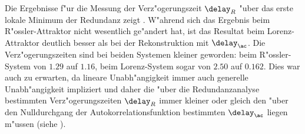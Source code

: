 Die Ergebnisse f"ur die Messung der Verz"ogerungszeit $\delay_R$ "uber das erste lokale
Minimum der Redundanz zeigt . W"ahrend sich das Ergebnis beim
R"ossler-Attraktor nicht wesentlich ge"andert hat, ist das Resultat beim Lorenz-Attraktor
deutlich besser als bei der Rekonstruktion mit $\delay_\ac$. Die Verz"ogerungszeiten sind
bei beiden Systemen kleiner geworden: beim R"ossler-System von $1.29$ auf $1.16$, beim
Lorenz-System sogar von $2.50$ auf $0.162$.  Dies war auch zu erwarten, da lineare
Unabh"angigkeit immer auch generelle Unabh"angigkeit impliziert und daher die "uber die
Redundanzanalyse bestimmten Verz"ogerungszeiten $\delay_R$ immer kleiner oder gleich den
"uber den Nulldurchgang der Autokorrelationsfunktion bestimmten $\delay_\ac$ liegen
m"ussen (siehe ).


 












